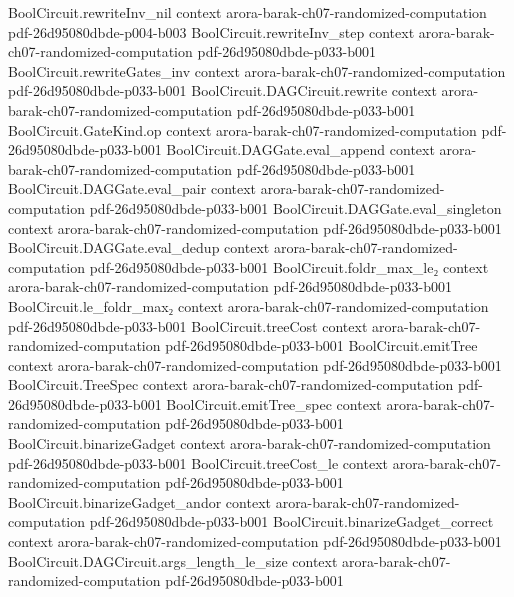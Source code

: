 \begin{theorem}
\proofstep
  {BoolCircuit.rewriteInv_nil}
  {context}
  {arora-barak-ch07-randomized-computation}
  {pdf-26d95080dbde-p004-b003}
\proofstep
  {BoolCircuit.rewriteInv_step}
  {context}
  {arora-barak-ch07-randomized-computation}
  {pdf-26d95080dbde-p033-b001}
\proofstep
  {BoolCircuit.rewriteGates_inv}
  {context}
  {arora-barak-ch07-randomized-computation}
  {pdf-26d95080dbde-p033-b001}
\proofstep
  {BoolCircuit.DAGCircuit.rewrite}
  {context}
  {arora-barak-ch07-randomized-computation}
  {pdf-26d95080dbde-p033-b001}
\proofstep
  {BoolCircuit.GateKind.op}
  {context}
  {arora-barak-ch07-randomized-computation}
  {pdf-26d95080dbde-p033-b001}
\proofstep
  {BoolCircuit.DAGGate.eval_append}
  {context}
  {arora-barak-ch07-randomized-computation}
  {pdf-26d95080dbde-p033-b001}
\proofstep
  {BoolCircuit.DAGGate.eval_pair}
  {context}
  {arora-barak-ch07-randomized-computation}
  {pdf-26d95080dbde-p033-b001}
\proofstep
  {BoolCircuit.DAGGate.eval_singleton}
  {context}
  {arora-barak-ch07-randomized-computation}
  {pdf-26d95080dbde-p033-b001}
\proofstep
  {BoolCircuit.DAGGate.eval_dedup}
  {context}
  {arora-barak-ch07-randomized-computation}
  {pdf-26d95080dbde-p033-b001}
\proofstep
  {BoolCircuit.foldr_max_le₂}
  {context}
  {arora-barak-ch07-randomized-computation}
  {pdf-26d95080dbde-p033-b001}
\proofstep
  {BoolCircuit.le_foldr_max₂}
  {context}
  {arora-barak-ch07-randomized-computation}
  {pdf-26d95080dbde-p033-b001}
\proofstep
  {BoolCircuit.treeCost}
  {context}
  {arora-barak-ch07-randomized-computation}
  {pdf-26d95080dbde-p033-b001}
\proofstep
  {BoolCircuit.emitTree}
  {context}
  {arora-barak-ch07-randomized-computation}
  {pdf-26d95080dbde-p033-b001}
\proofstep
  {BoolCircuit.TreeSpec}
  {context}
  {arora-barak-ch07-randomized-computation}
  {pdf-26d95080dbde-p033-b001}
\proofstep
  {BoolCircuit.emitTree_spec}
  {context}
  {arora-barak-ch07-randomized-computation}
  {pdf-26d95080dbde-p033-b001}
\proofstep
  {BoolCircuit.binarizeGadget}
  {context}
  {arora-barak-ch07-randomized-computation}
  {pdf-26d95080dbde-p033-b001}
\proofstep
  {BoolCircuit.treeCost_le}
  {context}
  {arora-barak-ch07-randomized-computation}
  {pdf-26d95080dbde-p033-b001}
\proofstep
  {BoolCircuit.binarizeGadget_andor}
  {context}
  {arora-barak-ch07-randomized-computation}
  {pdf-26d95080dbde-p033-b001}
\proofstep
  {BoolCircuit.binarizeGadget_correct}
  {context}
  {arora-barak-ch07-randomized-computation}
  {pdf-26d95080dbde-p033-b001}
\proofstep
  {BoolCircuit.DAGCircuit.args_length_le_size}
  {context}
  {arora-barak-ch07-randomized-computation}
  {pdf-26d95080dbde-p033-b001}

\end{theorem}
